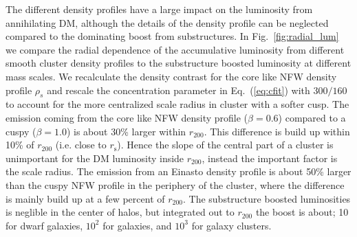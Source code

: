 \documentclass[10pt,aps,pra,reprint,amsmath,amsfonts,amssymb,showpacs]{revtex4-1}
\newcommand{\rmn}{\mathrm}
\newcommand{\s}{\rmn{s}}
\newcommand{\rhos}{\ensuremath{\rho_s}}
\newcommand{\rvir}{r_{200}}
\begin{document}
The different density profiles have a large impact on the luminosity
from annihilating DM, although the details of the density profile can
be neglected compared to the dominating boost from substructures. In
Fig.~\ref{fig:radial_lum} we compare the radial dependence of the
accumulative luminosity from different smooth cluster density profiles
to the substructure boosted luminosity at different mass scales. We
recalculate the density contrast for the core like NFW density profile
$\rhos$ and rescale the concentration parameter in Eq.~(\ref{eq:cfit})
with $300/160$ \cite{2011ApJ...728L..39N} to account for the more
centralized scale radius in cluster with a softer cusp. The emission
coming from the core like NFW density profile ($\beta=0.6$) compared
to a cuspy ($\beta=1.0$) is about 30\% larger within $\rvir$. This
difference is build up within 10\% of $\rvir$ (i.e. close to
$r_\s$). Hence the slope of the central part of a cluster is
unimportant for the DM luminosity inside $\rvir$, instead the
important factor is the scale radius. The emission from an Einasto
density profile is about 50\% larger than the cuspy NFW profile in the
periphery of the cluster, where the difference is mainly build up at a
few percent of $\rvir$. The substructure boosted luminosities is
neglible in the center of halos, but integrated out to $\rvir$ the
boost is about; 10 for dwarf galaxies, $10^2$ for galaxies, and $10^3$
for galaxy clusters.
\end{document}
